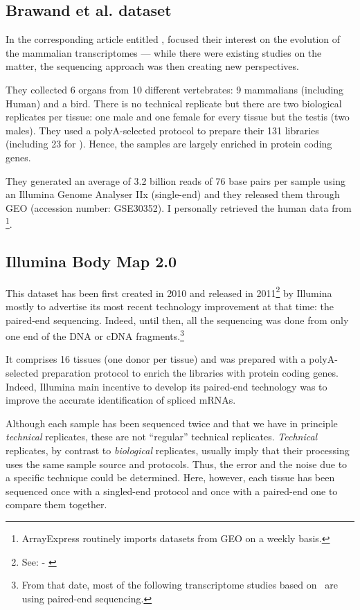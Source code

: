 \subsection{Brawand et al. dataset}

In the corresponding article entitled ,
\citet{VTpaper} focused their interest on the
evolution of the mammalian transcriptomes --- while there were existing studies
on the matter, the sequencing approach was then creating new perspectives.

They collected 6 organs from 10 different vertebrates:
9 mammalians (including Human) and a bird. There is no technical replicate
but there are two biological replicates per tissue:
one male and one female for every tissue but the testis (two males).
They used a polyA-selected protocol to prepare their 131 libraries (including 23
for ).
Hence, the samples are largely enriched in protein coding genes.

They generated an average of 3.2 billion reads of 76 base pairs per sample
using an Illumina Genome Analyser IIx (single-end) and they released them
through \gls{GEO} (accession number: GSE30352).
I personally retrieved the human data from
\footnote{ArrayExpress routinely imports
datasets from \gls{GEO} on a weekly basis.}.


\subsection{Illumina Body Map 2.0}
This dataset has been first created in 2010 and released in
2011\footnote{See:  - \cite{ibmEnsembl}} by Illumina
mostly to advertise its most recent technology improvement at that time:
the paired-end sequencing. Indeed, until then, all the sequencing was done
from only one end of the \gls{DNA} or \gls{cDNA} fragments.\footnote{From that
date, most of the following transcriptome studies based on \Rnaseq\ are using
paired-end sequencing.}

It comprises 16 tissues (one donor per tissue) and was prepared with a
polyA-selected preparation protocol to enrich the libraries with protein
coding genes. Indeed, Illumina main incentive to develop its paired-end
technology was to improve the accurate identification of spliced \glspl{mRNA}.

Although each sample has been sequenced twice and that we have in principle
\emph{technical} replicates, these are not ``regular'' technical replicates.
\emph{Technical} replicates, by contrast to \emph{biological} replicates,
usually imply that their processing uses the same sample source and protocols.
Thus, the error and the noise due to a specific technique could be determined.
Here, however, each tissue has been sequenced once with a singled-end protocol
and once with a paired-end one to compare them together.

